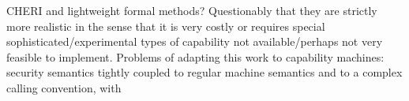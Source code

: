 {%
CHERI and lightweight formal methods?
%
Questionably that they are strictly more realistic in the sense that it is very
costly or requires special sophisticated/experimental types of capability not
available/perhaps not very feasible to implement.
%
Problems of adapting this work to capability machines: security semantics tightly
coupled to regular machine semantics and to a complex calling convention, with
}
